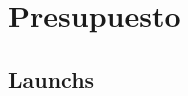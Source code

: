 \documentclass[spanish,a4paper,14pt,oneside]{extreport}
\begin{document}
\chapter{Presupuesto}
\label{chapter:presupuesto}




\newpage{\pagestyle{empty}}
\thispagestyle{empty}
\begin{appendix}

\chapter{Launchs}
\label{appendix:1}


% 
% 
% 

\end{appendix}




\nocite{*}

\end{document}
